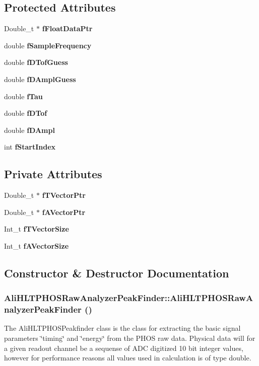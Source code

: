 \subsection*{Protected Attributes}
\begin{CompactItemize}
\item 
Double\_\-t $\ast$ {\bf f\-Float\-Data\-Ptr}
\item 
double {\bf f\-Sample\-Frequency}
\item 
double {\bf f\-DTof\-Guess}
\item 
double {\bf f\-DAmpl\-Guess}
\item 
double {\bf f\-Tau}
\item 
double {\bf f\-DTof}
\item 
double {\bf f\-DAmpl}
\item 
int {\bf f\-Start\-Index}
\end{CompactItemize}
\subsection*{Private Attributes}
\begin{CompactItemize}
\item 
Double\_\-t $\ast$ {\bf f\-TVector\-Ptr}
\item 
Double\_\-t $\ast$ {\bf f\-AVector\-Ptr}
\item 
Int\_\-t {\bf f\-TVector\-Size}
\item 
Int\_\-t {\bf f\-AVector\-Size}
\end{CompactItemize}


\subsection{Constructor \& Destructor Documentation}
\subsubsection{\setlength{\rightskip}{0pt plus 5cm}Ali\-HLTPHOSRaw\-Analyzer\-Peak\-Finder::Ali\-HLTPHOSRaw\-Analyzer\-Peak\-Finder ()}\label{classAliHLTPHOSRawAnalyzerPeakFinder_AliHLTPHOSRawAnalyzerPeakFindera0}


The Ali\-HLTPHOSPeakfinder class is the class for extracting the basic signal parameters \char`\"{}timing\char`\"{} and \char`\"{}energy\char`\"{} from the PHOS raw data. Physical data will for a given readout channel be a sequense of ADC digitized 10 bit integer values, however for performance reasons all values used in calculation is of type double. 

